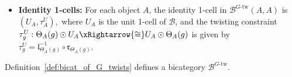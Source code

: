 \documentclass[11pt,oneside]{amsart}
\DeclareMathOperator{\id}{id}
\numberwithin{equation}{section}
\numberwithin{figure}{section}
\theoremstyle{plain}
\theoremstyle{definition}
\theoremstyle{remark}
\begin{document}
\begin{definition}
\begin{itemize}
\[\begin{tikzcd}[row sep=5mm, column sep=6mm]
    (M\odot N)\odot \Theta_C(g) & M\odot (N\odot \Theta_C(g)) \arrow[l,Rightarrow,"\mathfrak a^{-1}"] & M\odot (\Theta_B(g)\odot N) \arrow[l,Rightarrow,"\id\odot \sigma_g"]
    \end{tikzcd}\]
  \item \textbf{Identity 1-cells:} For each object $A$, the identity 1-cell in
    $\mathcal B^{G\text{-tw}}(A,A)$ is
    \(
        (U_A,\tau^U_A),
    \)
    where $U_A$ is the unit 1-cell of $\mathcal B$, and the twisting constraint
    $
    \tau^U_g:\Theta_A(g)\odot U_A \xRightarrow{\cong} U_A\odot \Theta_A(g)
    $
    is given by
    \(
    \tau^U_g = \mathfrak l_{\Theta_A(g)}^{-1}\circ \mathfrak r_{\Theta_A(g)}.
    \)
\end{itemize}
\end{definition}


\begin{prop}\label{prop:bicat-of-G-twists}
Definition~\ref{def:bicat_of_G_twists} defines a bicategory
\(\mathcal B^{G\text{-tw}}\).
\end{prop}
\end{document}
